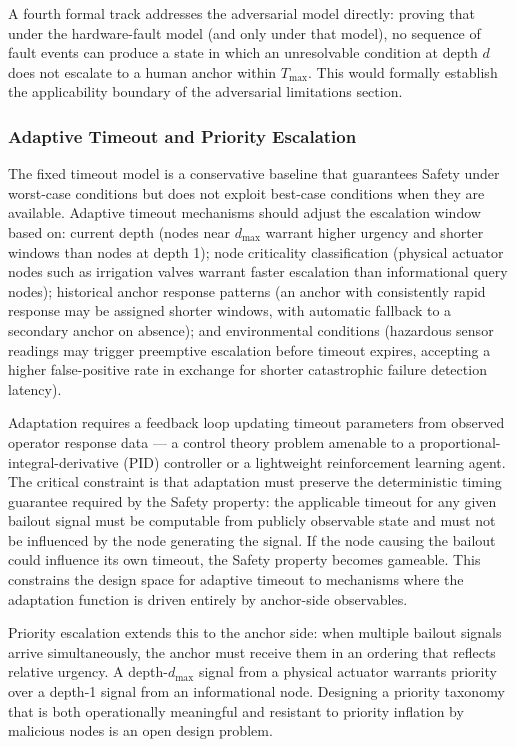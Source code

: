 A fourth formal track addresses the adversarial model directly: proving that under the hardware-fault model (and only under that model), no sequence of fault events can produce a state in which an unresolvable condition at depth $d$ does not escalate to a human anchor within $T_{\max}$. This would formally establish the applicability boundary of the adversarial limitations section.

\subsubsection{Adaptive Timeout and Priority Escalation}
\label{sec:future-adaptive-timeout}

The fixed timeout model is a conservative baseline that guarantees Safety under worst-case conditions but does not exploit best-case conditions when they are available. Adaptive timeout mechanisms should adjust the escalation window based on: current depth (nodes near $d_{\max}$ warrant higher urgency and shorter windows than nodes at depth 1); node criticality classification (physical actuator nodes such as irrigation valves warrant faster escalation than informational query nodes); historical anchor response patterns (an anchor with consistently rapid response may be assigned shorter windows, with automatic fallback to a secondary anchor on absence); and environmental conditions (hazardous sensor readings may trigger preemptive escalation before timeout expires, accepting a higher false-positive rate in exchange for shorter catastrophic failure detection latency).

Adaptation requires a feedback loop updating timeout parameters from observed operator response data --- a control theory problem amenable to a proportional-integral-derivative (PID) controller or a lightweight reinforcement learning agent. The critical constraint is that adaptation must preserve the deterministic timing guarantee required by the Safety property: the applicable timeout for any given bailout signal must be computable from publicly observable state and must not be influenced by the node generating the signal. If the node causing the bailout could influence its own timeout, the Safety property becomes gameable. This constrains the design space for adaptive timeout to mechanisms where the adaptation function is driven entirely by anchor-side observables.

Priority escalation extends this to the anchor side: when multiple bailout signals arrive simultaneously, the anchor must receive them in an ordering that reflects relative urgency. A depth-$d_{\max}$ signal from a physical actuator warrants priority over a depth-1 signal from an informational node. Designing a priority taxonomy that is both operationally meaningful and resistant to priority inflation by malicious nodes is an open design problem.

